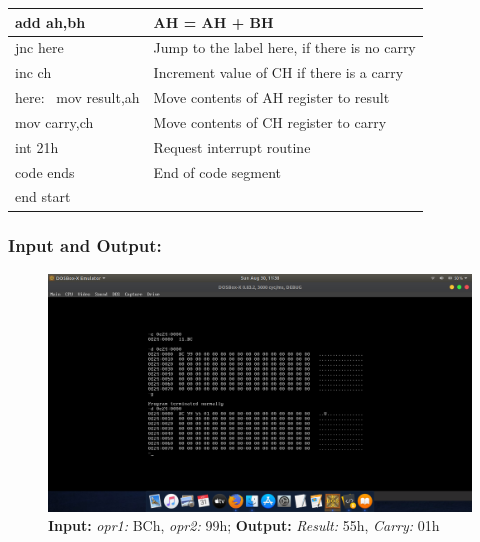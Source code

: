 \documentclass[12pt,a4paper]{article}
\begin{document}
\begin{flushleft}
\begin{table}[htb]
{\begin{tabular}{|l|l|}
\hline
add ah,bh                                                        & AH = AH + BH                                  \\ 
\hline
jnc here                                                         & Jump to the label here, if there is no carry  \\ 
\hline
inc ch                                                           & Increment value of CH if there is a carry     \\ 
\hline
here:~ mov result,ah                                             & Move contents of AH register to result        \\ 
\hline
mov carry,ch                                                     & Move contents of CH register to carry         \\ 
\hline
int 21h                                                          & Request interrupt routine                     \\ 
\hline
code ends                                                        & End of code segment                           \\
\hline
end start                                                        &                                               \\
\hline
\end{tabular}
}
\end{table}

\newpage
\subsubsection*{\textbf{Input and Output:}}
\begin{figure}[h]
    \centering
    \includegraphics[trim = 100mm 70mm 100mm 80mm, clip, width = \textwidth]{Addition.png}
    \caption{ \textbf{Input:} \emph{opr1:} BCh, \emph{opr2:} 99h; 
              \textbf{Output:} \emph{Result:} 55h, \emph{Carry:} 01h}
\end{figure}
\newpage

\end{flushleft}
\end{document}
